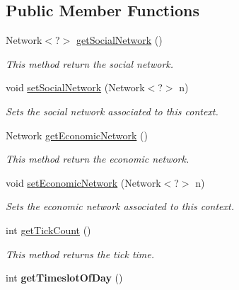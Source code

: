 \subsection*{Public Member Functions}
\begin{DoxyCompactItemize}
\item 
Network$<$?$>$ \hyperlink{classuk_1_1ac_1_1dmu_1_1iesd_1_1cascade_1_1context_1_1_cascade_context_ad1062c31d00f20933aacfee16ae461be}{get\-Social\-Network} ()
\begin{DoxyCompactList}\small\item\em This method return the social network. \end{DoxyCompactList}\item 
void \hyperlink{classuk_1_1ac_1_1dmu_1_1iesd_1_1cascade_1_1context_1_1_cascade_context_a7524db3c9258e94cfe218f70d36129e9}{set\-Social\-Network} (Network$<$?$>$ n)
\begin{DoxyCompactList}\small\item\em Sets the social network associated to this context. \end{DoxyCompactList}\item 
Network \hyperlink{classuk_1_1ac_1_1dmu_1_1iesd_1_1cascade_1_1context_1_1_cascade_context_afae7c92610f4bd4cfc37a1b76af39859}{get\-Economic\-Network} ()
\begin{DoxyCompactList}\small\item\em This method return the economic network. \end{DoxyCompactList}\item 
void \hyperlink{classuk_1_1ac_1_1dmu_1_1iesd_1_1cascade_1_1context_1_1_cascade_context_abb361630fdd57a3394629e53a8de80a8}{set\-Economic\-Network} (Network$<$?$>$ n)
\begin{DoxyCompactList}\small\item\em Sets the economic network associated to this context. \end{DoxyCompactList}\item 
int \hyperlink{classuk_1_1ac_1_1dmu_1_1iesd_1_1cascade_1_1context_1_1_cascade_context_a54856f2c74d6bfe2ddac0801a26d5c95}{get\-Tick\-Count} ()
\begin{DoxyCompactList}\small\item\em This method returns the tick time. \end{DoxyCompactList}\item 
\hypertarget{classuk_1_1ac_1_1dmu_1_1iesd_1_1cascade_1_1context_1_1_cascade_context_ab995752b88f6b23b4d3da27756d2c6d4}{int {\bfseries get\-Timeslot\-Of\-Day} ()}\label{classuk_1_1ac_1_1dmu_1_1iesd_1_1cascade_1_1context_1_1_cascade_context_ab995752b88f6b23b4d3da27756d2c6d4}


\end{DoxyCompactItemize}
